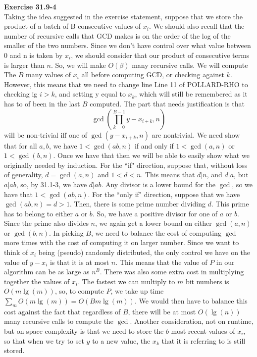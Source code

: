 \documentclass{article}
\begin{document}
\noindent\textbf{Exercise 31.9-4}\\

Taking the idea suggested in the exercise statement, suppose that we store the product of a batch of B consecutive values of $x_i$. We should also recall that the number of recursive calls that GCD makes is on the order of the log of the smaller of the two numbers. Since we don't have control over what value between 0 and n is taken by $x_i$, we should consider that our product of consecutive terms is larger than $n$. So, we will make $O(\beta)$ many recursive calls. We will compute The $B$ many values of $x_i$ all before computing GCD, or checking against $k$. However, this means that we need to change line Line 11 of POLLARD-RHO to checking ig $i>k$, and setting y equal to $x_k$, which will still be remembered as it has to of been in the last $B$ computed. The part that needs justification is that 
\[
\gcd\left( \prod_{k=0}^{B-1} y - x_{i+k} , n\right)
\]
will be non-trivial iff one of  $\gcd(y-x_{i+k},n)$ are nontrivial. We need show that for all $a,b$, we have $1<\gcd(ab,n)$ if and only if $1<\gcd(a,n)$ or $1<\gcd(b,n)$. Once we have that then we will be able to easily show what we originally needed by induction. For the ``if" direction, suppose that, without loss of generality, $d = \gcd(a,n)$ and $1<d<n$. This means that $d|n$, and $d|a$, but $a|ab$, so, by 31.1-3, we have $d|ab$. Any divisor is a lower bound for the $\gcd$, so we have that $1<\gcd(ab,n)$. For the ``only if" direction, suppose that we have $\gcd(ab,n) =d>1$. Then, there is some prime number dividing $d$. This prime has to belong to either $a$ or $b$. So, we have a positive divisor for one of $a$ or $b$. Since the prime also divides $n$, we again get a lower bound on either $\gcd(a,n)$ or $\gcd(b,n)$. In picking $B$, we need to balance the cost of computing $\gcd$ more times with the cost of computing it on larger number. Since we want to think of $x_i$ being (pseudo) randomly distributed, the only control we have on the value of $y-x_i$ is that it is at most $n$. This means that the value of $P$ in our algorithm can be as large as $n^B$. There was also some extra cost in multiplying together the values of $x_i$. The fastest we can multiply to $m$ bit numbers is $O(m\lg(m))$, so, to compute $P$, we take up time $\sum_m O(m\lg(m)) = O(Bm\lg(m))$. We would then have to balance this cost against the fact that regardless of $B$, there will be at most $O(\lg(n))$ many recursive calls to compute the $\gcd$. Another consideration, not on runtime, but on space complexity is that we need to store the $b$ most recent values of $x_i$, so that when we try to set $y$ to a new value, the $x_k$ that it is referring to is still stored.
\end{document}
